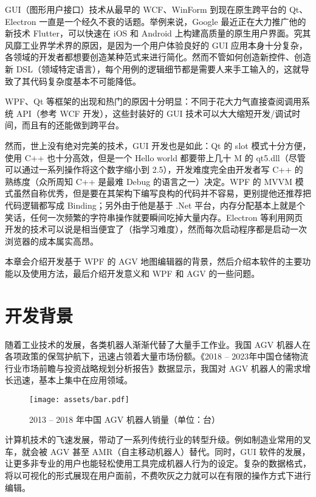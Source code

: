 
GUI（图形用户接口）技术从最早的 WCF、WinForm 到现在原生跨平台的 Qt、Electron 一直是一个经久不衰的话题。举例来说，Google 最近正在大力推广他的新技术 Flutter，可以快速在 iOS 和 Android 上构建高质量的原生用户界面。究其风靡工业界学术界的原因，是因为一个用户体验良好的 GUI 应用本身十分复杂，各领域的开发者都想要创造某种范式\cite{url:uiArchs}来进行简化。然而不管如何创造新控件、创造新 DSL（领域特定语言），每个用例的逻辑细节都是需要人来手工输入的，这就导致了其代码复杂度基本不可能降低。

WPF、Qt 等框架的出现和热门的原因十分明显：不同于花大力气直接查阅调用系统 API（参考 WCF 开发），这些封装好的 GUI 技术可以大大缩短开发/调试时间，而且有的还能做到跨平台。

然而，世上没有绝对完美的技术，GUI 开发也是如此：Qt 的 slot 模式十分方便，使用 C++ 也十分高效，但是一个 Hello world 都要带上几十 M 的 qt5.dll（尽管可以通过一系列操作将这个数字缩小到 2.5），开发难度完全由开发者写 C++ 的熟练度（众所周知 C++ 是最难 Debug 的语言之一）决定。WPF 的 MVVM 模式虽然自称优秀，但是要在其架构下编写良构的代码并不容易，更别提他还推荐把代码逻辑都写成 Binding；另外由于他是基于 .Net 平台，内存分配基本上就是个笑话，任何一次频繁的字符串操作就要瞬间吃掉大量内存。Electron 等利用网页开发的技术可以说是相当便宜了（指学习难度），然而每次启动程序都是启动一次浏览器的成本属实高昂。

本章会介绍开发基于 WPF 的 AGV 地图编辑器的背景，然后介绍本软件的主要功能以及使用方法，最后介绍开发意义和 WPF 和 AGV 的一些问题。

\section{开发背景}

随着工业技术的发展，各类机器人渐渐代替了大量手工作业。我国 AGV 机器人在各项政策的保驾护航下，迅速占领着大量市场份额。《2018 -- 2023年中国仓储物流行业市场前瞻与投资战略规划分析报告》数据\cite{url:20180131C02LR0}显示，我国对 AGV 机器人的需求增长迅速，基本上集中在应用领域。

\begin{figure}[H]
  \centering
  \texttt{[image: assets/bar.pdf]}
  \caption{2013 -- 2018 年中国 AGV 机器人销量（单位：台）}
  \label{fig:figure1}
\end{figure}

计算机技术的飞速发展，带动了一系列传统行业的转型升级。例如制造业常用的叉车，就会被 AGV 甚至 AMR（自主移动机器人）替代。同时，GUI 软件的发展，让更多非专业的用户也能轻松使用工具完成机器人行为的设定。复杂的数据格式，将以可视化的形式展现在用户面前，不费吹灰之力就可以在有限的操作方式下进行编辑。

